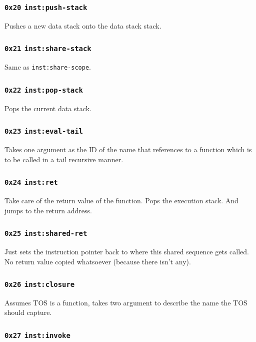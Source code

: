 \documentclass{article}
\newcommand{\inst}[1] {\texttt{inst:#1}}
\begin{document}
\subsubsection{\texttt{0x20} \inst{push-stack}}

Pushes a new data stack onto the data stack stack.

\subsubsection{\texttt{0x21} \inst{share-stack}}

Same as \inst{share-scope}.

\subsubsection{\texttt{0x22} \inst{pop-stack}}

Pops the current data stack.

\subsubsection{\texttt{0x23} \inst{eval-tail}}

Takes one argument as the ID of the name that references to a function which is to be called in a tail recursive manner.

\subsubsection{\texttt{0x24} \inst{ret}}

Take care of the return value of the function. Pops the execution stack. And jumps to the return address.

\subsubsection{\texttt{0x25} \inst{shared-ret}}

Just sets the instruction pointer back to where this shared sequence gets called. No return value copied whatsoever (because there isn't any).

\subsubsection{\texttt{0x26} \inst{closure}}

Assumes TOS is a function, takes two argument to describe the name the TOS should capture.

\subsubsection{\texttt{0x27} \inst{invoke}}
\end{document}
